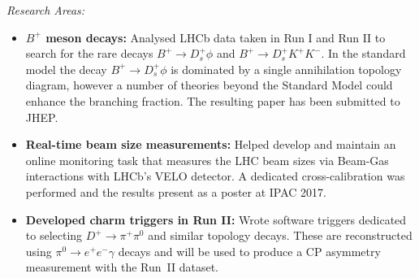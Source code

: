 \documentclass[11pt,a4paper]{article}
\begin{document}
\noindent\emph{Research Areas:} 
\begin{itemize}
\setlength\itemsep{0em}
\item {\bf $B^{+}$ meson decays:} Analysed LHCb data taken in Run I and Run II  to search for the rare decays $B^{+} \to D_{s}^{+} \phi$ and $B^{+} \to D_{s}^{+} K^{+} K^{-}$. In the standard model the decay $B^{+} \to D_{s}^{+} \phi$ is dominated by a single annihilation topology diagram, however a number of theories beyond the Standard Model could enhance the branching fraction. The resulting paper has been submitted to JHEP.


\item {\bf Real-time beam size measurements:} Helped develop and maintain an online monitoring task that measures the LHC beam sizes via Beam-Gas interactions with LHCb's VELO detector. A dedicated cross-calibration was performed and the results present as a poster at IPAC 2017.

\item {\bf Developed charm triggers in Run II:} Wrote software triggers dedicated to selecting $D^{+} \to \pi^{+} \pi^{0}$ and similar topology decays. These are reconstructed using $\pi^{0} \to e^{+} e^{-} \gamma$ decays and will be used to produce a CP asymmetry measurement with the Run~II dataset.
\end{itemize}
\end{document}
